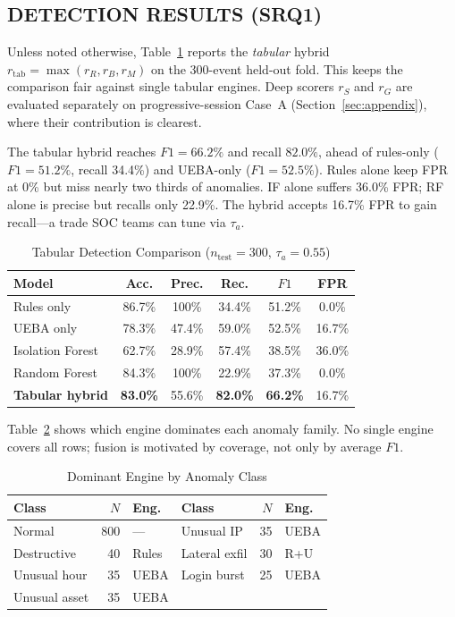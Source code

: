 \documentclass{ieeeaccess}
\begin{document}
\subsection{DETECTION RESULTS (SRQ1)}
Unless noted otherwise, Table~\ref{tab:detection} reports the \textit{tabular} hybrid $r_{\mathrm{tab}}=\max(r_R,r_B,r_M)$ on the 300-event held-out fold. This keeps the comparison fair against single tabular engines. Deep scorers $r_S$ and $r_G$ are evaluated separately on progressive-session Case~A (Section~\ref{sec:appendix}), where their contribution is clearest.

The tabular hybrid reaches $F1=66.2\%$ and recall $82.0\%$, ahead of rules-only ($F1=51.2\%$, recall 34.4\%) and UEBA-only ($F1=52.5\%$). Rules alone keep FPR at 0\% but miss nearly two thirds of anomalies. IF alone suffers 36.0\% FPR; RF alone is precise but recalls only 22.9\%. The hybrid accepts 16.7\% FPR to gain recall---a trade SOC teams can tune via $\tau_a$.

\begin{table}[!t]
\caption{Tabular Detection Comparison ($n_{\mathrm{test}}=300$, $\tau_a=0.55$)}
\label{tab:detection}
\centering
\scriptsize
\begin{tabular}{@{}lccccc@{}}
\toprule
\textbf{Model} & Acc. & Prec. & Rec. & $F1$ & FPR \\
\midrule
Rules only & 86.7\% & 100\% & 34.4\% & 51.2\% & 0.0\% \\
UEBA only & 78.3\% & 47.4\% & 59.0\% & 52.5\% & 16.7\% \\
Isolation Forest & 62.7\% & 28.9\% & 57.4\% & 38.5\% & 36.0\% \\
Random Forest & 84.3\% & 100\% & 22.9\% & 37.3\% & 0.0\% \\
\textbf{Tabular hybrid} & \textbf{83.0\%} & 55.6\% & \textbf{82.0\%} & \textbf{66.2\%} & 16.7\% \\
\bottomrule
\end{tabular}
\end{table}

Table~\ref{tab:per-class} shows which engine dominates each anomaly family. No single engine covers all rows; fusion is motivated by coverage, not only by average $F1$.

\begin{table}[!t]
\caption{Dominant Engine by Anomaly Class}
\label{tab:per-class}
\centering
\scriptsize
\begin{tabular}{@{}lrl|lrl@{}}
\toprule
\textbf{Class} & $N$ & \textbf{Eng.} & \textbf{Class} & $N$ & \textbf{Eng.} \\
\midrule
Normal & 800 & --- & Unusual IP & 35 & UEBA \\
Destructive & 40 & Rules & Lateral exfil & 30 & R+U \\
Unusual hour & 35 & UEBA & Login burst & 25 & UEBA \\
Unusual asset & 35 & UEBA & & & \\
\bottomrule
\end{tabular}
\end{table}
\end{document}
